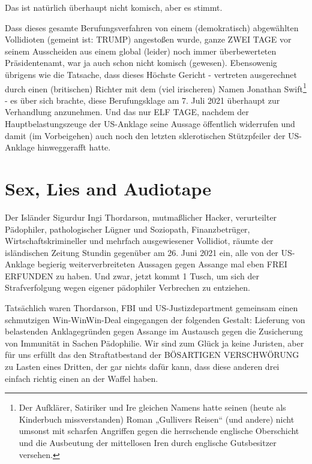 \begin{multicols}{2}
Das ist natürlich überhaupt nicht komisch, aber es
stimmt.

Dass dieses gesamte Berufungsverfahren von einem
(demokratisch) abgewählten Vollidioten (gemeint ist:
TRUMP) angestoßen wurde, ganze ZWEI TAGE vor seinem Ausscheiden aus einem global (leider) noch immer
überbewerteten Präsidentenamt, war ja auch schon
nicht komisch (gewesen). Ebensowenig übrigens wie
die Tatsache, dass dieses Höchste Gericht - vertreten
ausgerechnet durch einen (britischen) Richter mit dem
(viel irischeren) Namen Jonathan Swift\footnote[19]{Der Aufklärer, Satiriker und Ire gleichen Namens hatte seinen (heute als Kinderbuch missverstanden) Roman
„Gullivers Reisen“ (und andere) nicht umsonst mit scharfen Angriffen gegen die herrschende englische Oberschicht und die Ausbeutung der mittellosen Iren durch englische Gutsbesitzer versehen.} - es über sich
brachte, diese Berufungsklage am 7. Juli 2021 überhaupt
zur Verhandlung anzunehmen. Und das nur ELF TAGE,
nachdem der Hauptbelastungszeuge der US-Anklage
seine Aussage öffentlich widerrufen und damit (im Vorbeigehen) auch noch den letzten sklerotischen Stützpfeiler der US-Anklage hinweggerafft hatte.



\chapter{Sex, Lies and Audiotape} %

Der Isländer Sigurdur Ingi Thordarson, mutmaßlicher
Hacker, verurteilter Pädophiler, pathologischer Lügner
und Soziopath, Finanzbetrüger, Wirtschaftskrimineller
und mehrfach ausgewiesener Vollidiot, räumte der isländischen Zeitung Stundin gegenüber am 26. Juni 2021
ein, alle von der US-Anklage begierig weiterverbreiteten
Aussagen gegen Assange mal eben FREI ERFUNDEN
zu haben. Und zwar, jetzt kommt 1 Tusch, um sich der
Strafverfolgung wegen eigener pädophiler Verbrechen
zu entziehen.

Tatsächlich waren Thordarson, FBI und US-Justizdepartment gemeinsam einen schmutzigen Win-WinWin-Deal eingegangen der folgenden Gestalt: Lieferung
von belastenden Anklagegründen gegen Assange im
Austausch gegen die Zusicherung von Immunität in Sachen Pädophilie. Wir sind zum Glück ja keine Juristen,
aber für uns erfüllt das den Straftatbestand der BÖSARTIGEN VERSCHWÖRUNG zu Lasten eines Dritten, der
gar nichts dafür kann, dass diese anderen drei einfach
richtig einen an der Waffel haben.


\end{multicols}
